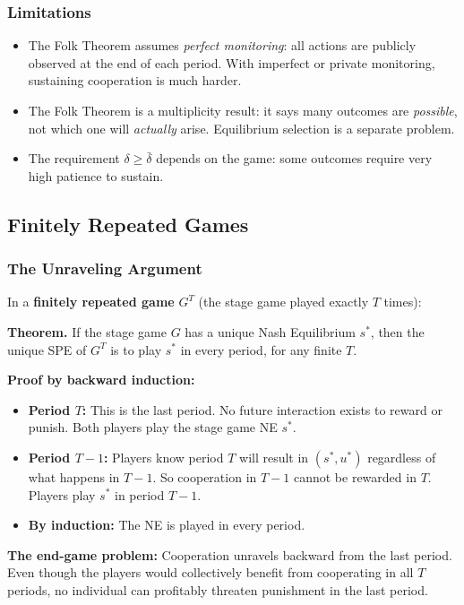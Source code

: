 \documentclass[hidelinks]{article}
\begin{document}
\subsubsection{Limitations}

\begin{itemize}
    \item The Folk Theorem assumes \textit{perfect monitoring}: all actions are publicly observed at the end of each period. With imperfect or private monitoring, sustaining cooperation is much harder.
    \item The Folk Theorem is a multiplicity result: it says many outcomes are \textit{possible}, not which one will \textit{actually} arise. Equilibrium selection is a separate problem.
    \item The requirement $\delta \geq \bar{\delta}$ depends on the game: some outcomes require very high patience to sustain.
\end{itemize}

\subsection{Finitely Repeated Games}

\subsubsection{The Unraveling Argument}

In a \textbf{finitely repeated game} $G^T$ (the stage game played exactly $T$ times):

\textbf{Theorem.} If the stage game $G$ has a unique Nash Equilibrium $s^*$, then the unique SPE of $G^T$ is to play $s^*$ in every period, for any finite $T$.

\textbf{Proof by backward induction:}
\begin{itemize}
    \item \textbf{Period $T$:} This is the last period. No future interaction exists to reward or punish. Both players play the stage game NE $s^*$.
    \item \textbf{Period $T-1$:} Players know period $T$ will result in $(s^*, u^*)$ regardless of what happens in $T-1$. So cooperation in $T-1$ cannot be rewarded in $T$. Players play $s^*$ in period $T-1$.
    \item \textbf{By induction:} The NE is played in every period.
\end{itemize}

\textbf{The end-game problem:} Cooperation unravels backward from the last period. Even though the players would collectively benefit from cooperating in all $T$ periods, no individual can profitably threaten punishment in the last period.
\end{document}
